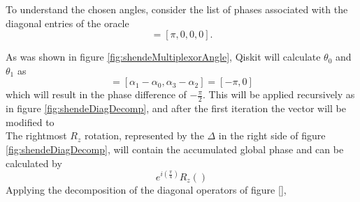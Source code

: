 \documentclass[../../../dissertation.tex]{subfiles}
\begin{document}
To understand the chosen angles, consider the list 
of phases associated with the diagonal entries of the oracle
\begin{equation} 
	[\alpha_0,\alpha_1,\alpha_2,\alpha_3] = [\pi,0,0,0].
\end{equation}\par
As was shown in figure \ref{fig:shendeMultiplexorAngle}, Qiskit will calculate $\theta_0$ and $\theta_1$ as
\begin{equation}
    [\theta_0, \theta_1] = [\alpha_1 - \alpha_0, \alpha_3 - \alpha_2] = [-\pi,0]
\end{equation}
which will result in the phase difference of $-\frac{\pi}{2}$. This will be applied recursively as in figure \ref{fig:shendeDiagDecomp}, and after the first iteration the vector will be modified to
\begin{equation}
        [\frac{\pi}{2},0,0,0]
\end{equation}
The rightmost $R_z$ rotation, represented by the $\Delta$ in the right side of figure \ref{fig:shendeDiagDecomp}, will contain the accumulated global phase and can be calculated by
\begin{equation}
e^{i\left(\frac{\pi}{4}\right)}R_z ()
\end{equation}
Applying the decomposition of the diagonal operators of figure \ref{}, 
\end{document}
